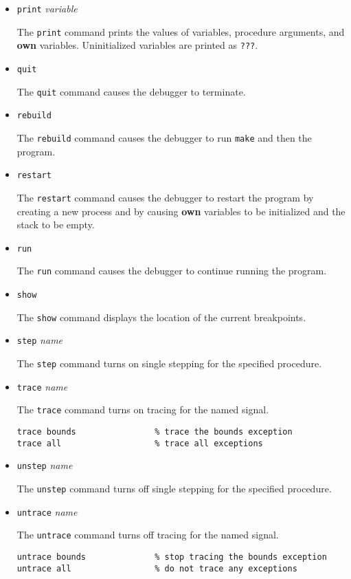\begin{itemize}
\item {\tt print} {\it variable}

The {\tt print} command prints the values of variables, procedure arguments,
and {\bf own} variables.  Uninitialized variables are printed as {\tt ???}.

\item {\tt quit}

The {\tt quit} command causes the debugger to terminate.

\item {\tt rebuild}

The {\tt rebuild} command causes the debugger to run {\tt make} and then the
program.

\item {\tt restart}

The {\tt restart} command causes the debugger to restart the program
by creating a new process and by causing {\bf own} variables to be
initialized and the stack to be empty.

\item {\tt run}

The {\tt run} command causes the debugger to continue running the program.  

\item {\tt show}

The {\tt show} command displays the location of the current breakpoints.

\item {\tt step} {\it name}

The {\tt step} command turns on single stepping for the specified procedure.

\item {\tt trace} {\it name}

The {\tt trace} command turns on tracing for the named signal.
\begin{verbatim}
trace bounds                % trace the bounds exception
trace all                   % trace all exceptions
\end{verbatim}

\item {\tt unstep} {\it name}

The {\tt unstep} command turns off single stepping for the specified procedure.

\item {\tt untrace} {\it name}

The {\tt untrace} command turns off tracing for the named signal.
\begin{verbatim}
untrace bounds              % stop tracing the bounds exception
untrace all                 % do not trace any exceptions
\end{verbatim}


\end{itemize}
